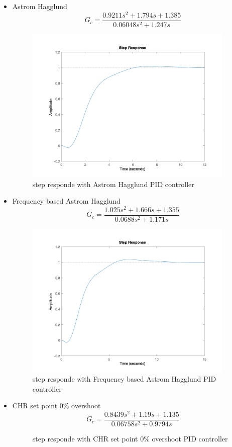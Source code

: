 \begin{itemize}
\begin{figure}[H]
    \end{figure} 
    \item Astrom Hagglund
    $$
    G_c =   \dfrac{0.9211 s^2 + 1.794 s + 1.385}{0.06048 s^2 + 1.247 s}
    $$ 
    \begin{figure}[H]
        \caption{step responde with Astrom Hagglund PID controller}
        \centering
        \includegraphics[width=10cm]{../Figure/Q1/b/ah.png}
    \end{figure}  
    \item Frequency based Astrom Hagglund
    $$
    G_c =   \dfrac{1.025 s^2 + 1.666 s + 1.355}{0.0688 s^2 + 1.171 s}
    $$ 
    \begin{figure}[H]
        \caption{step responde with Frequency based Astrom Hagglund PID controller}
        \centering
        \includegraphics[width=10cm]{../Figure/Q1/b/fah.png}
    \end{figure} 
    \item CHR set point $0\%$ overshoot
    $$
    G_c =   \dfrac{0.8439 s^2 + 1.19 s + 1.135}{0.06758 s^2 + 0.9794 s}
    $$ 
    \begin{figure}[H]
        \caption{step responde with CHR set point $0\%$ overshoot PID controller}

\end{figure}
\end{itemize}
